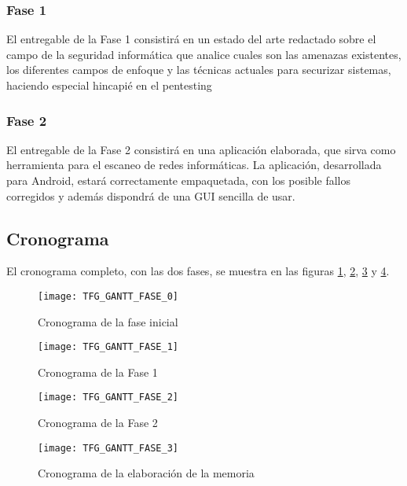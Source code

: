 \subsubsection{Fase 1}
El entregable de la Fase 1 consistirá en un estado del arte redactado sobre el campo de la seguridad informática que analice cuales son las amenazas existentes, los diferentes campos de enfoque y las técnicas actuales para securizar sistemas, haciendo especial hincapié en el pentesting

\subsubsection{Fase 2}
El entregable de la Fase 2 consistirá en una aplicación elaborada, que sirva como herramienta para el escaneo de redes informáticas. La aplicación, desarrollada para Android, estará correctamente empaquetada, con los posible fallos corregidos y además dispondrá de una GUI sencilla de usar.

\subsection{Cronograma}
El cronograma completo, con las dos fases, se muestra en las figuras \ref{fig:gantt0}, \ref{fig:gantt1}, \ref{fig:gantt2} y \ref{fig:gantt3}.

\begin{figure}[H]
	\centering
	\texttt{[image: TFG\_GANTT\_FASE\_0]}
	\caption{Cronograma de la fase inicial}
	\label{fig:gantt0}
\end{figure}

\begin{landscape}

\begin{figure}[H]
	\centering
	\texttt{[image: TFG\_GANTT\_FASE\_1]}
	\caption{Cronograma de la Fase 1}
	\label{fig:gantt1}
\end{figure}

\begin{figure}[H]
	\centering
	\texttt{[image: TFG\_GANTT\_FASE\_2]}
	\caption{Cronograma de la Fase 2}
	\label{fig:gantt2}
\end{figure}

\end{landscape}

\begin{figure}[H]
	\centering
	\texttt{[image: TFG\_GANTT\_FASE\_3]}
	\caption{Cronograma de la elaboración de la memoria}
	\label{fig:gantt3}
\end{figure}



